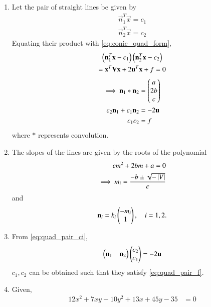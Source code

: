 \renewcommand{\theequation}{\theenumi}
\begin{enumerate}[label=\thesection.\arabic*.,ref=\thesection.\theenumi]

\item Let the pair of straight lines be given by 
\begin{align}
\label{eq:quad_pair_lines}
\vec{n}_1^T \vec{x} = c_1
\\
\vec{n}_2^T \vec{x} = c_2
\end{align}
Equating their product with \eqref{eq:conic_quad_form},
\begin{multline}
\left(\mathbf{n}_1^T \mathbf{x} - c_1\right)
\left(\mathbf{n}_2^T \mathbf{x} - c_2\right) 
\\
=
\mathbf{x}^T\mathbf{V}\mathbf{x}+2\mathbf{u}^T\mathbf{x}+f=0
\end{multline}
\begin{align}
\implies 
\mathbf{n}_1 *\mathbf{n}_2  &= \begin{pmatrix}a \\ 2b \\c\end{pmatrix}
\label{eq:quad_pair_conv}
\\
c_2\mathbf{n}_1 + c_1 \mathbf{n}_2 &= -2\mathbf{u}
\label{eq:quad_pair_ci}
\\
c_1 c_2 &= f
\label{eq:quad_pair_f}
\end{align}
%
where $*$ represents convolution.
\item The slopes of the lines are given by the roots of the polynomial
\begin{align}
\label{eq:quad_pair_slopes}
cm^2 + 2bm + a = 0
\\
\implies m_i = \frac{-b \pm \sqrt{-\left\vert V\right\vert}}{c}
\end{align}
and 
\begin{align}
\mathbf{n}_i = k_i\begin{pmatrix}-m_i\\1\end{pmatrix}, \quad i = 1,2.
\end{align}
\item From \eqref{eq:quad_pair_ci},
\begin{align}
\label{eq:quad_pair_ci_mat}
\begin{pmatrix}\mathbf{n}_1 & \mathbf{n}_2\end{pmatrix}\begin{pmatrix}c_2\\c_1\end{pmatrix} = -2\mathbf{u}
\end{align}
$c_1,c_2$ can be obtained such that they satisfy \eqref{eq:quad_pair_f}.

\item 
Given,
\begin{align}
    12x^2+7xy-10y^2+13x+45y-35&=0 
\label{eq:pair_given}
\end{align}


\end{enumerate}
